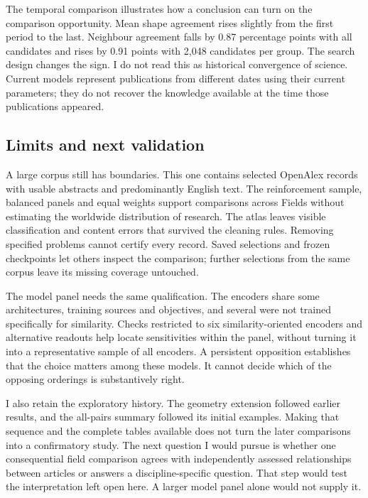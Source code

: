\documentclass[12pt]{article}
\begin{document}
The temporal comparison illustrates how a conclusion can turn on the comparison opportunity. Mean shape agreement rises slightly from the first period to the last. Neighbour agreement falls by 0.87 percentage points with all candidates and rises by 0.91 points with 2,048 candidates per group. The search design changes the sign. I do not read this as historical convergence of science. Current models represent publications from different dates using their current parameters; they do not recover the knowledge available at the time those publications appeared.

\subsection{Limits and next validation}
A large corpus still has boundaries. This one contains selected OpenAlex records with usable abstracts and predominantly English text. The reinforcement sample, balanced panels and equal weights support comparisons across Fields without estimating the worldwide distribution of research. The atlas leaves visible classification and content errors that survived the cleaning rules. Removing specified problems cannot certify every record. Saved selections and frozen checkpoints let others inspect the comparison; further selections from the same corpus leave its missing coverage untouched.

The model panel needs the same qualification. The encoders share some architectures, training sources and objectives, and several were not trained specifically for similarity. Checks restricted to six similarity-oriented encoders and alternative readouts help locate sensitivities within the panel, without turning it into a representative sample of all encoders. A persistent opposition establishes that the choice matters among these models. It cannot decide which of the opposing orderings is substantively right.

I also retain the exploratory history. The geometry extension followed earlier results, and the all-pairs summary followed its initial examples. Making that sequence and the complete tables available does not turn the later comparisons into a confirmatory study. The next question I would pursue is whether one consequential field comparison agrees with independently assessed relationships between articles or answers a discipline-specific question. That step would test the interpretation left open here. A larger model panel alone would not supply it.
\end{document}
